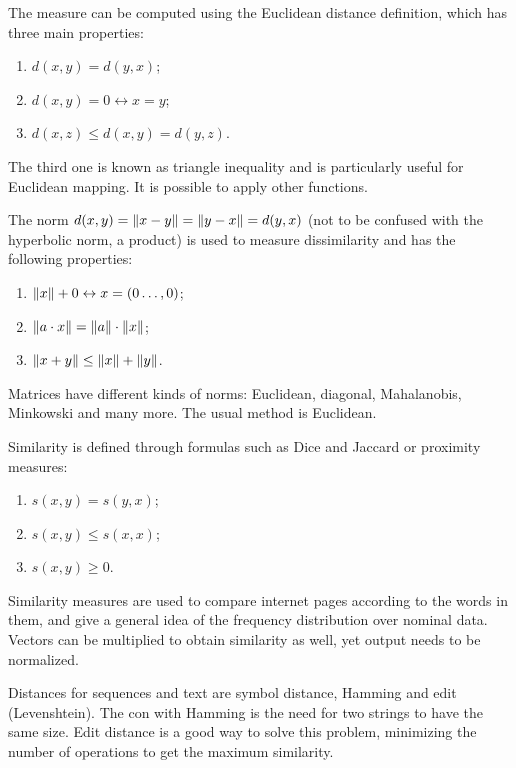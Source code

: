 The measure can be computed using the Euclidean distance definition, which has three main properties:
\begin{enumerate}
	\item $d(x, y) = d(y, x)$;
	\item $d(x, y) = 0 \leftrightarrow x = y$;
	\item $d(x, z) \leq d(x, y) = d(y, z)$.
\end{enumerate}
The third one is known as triangle inequality and is particularly useful for Euclidean mapping. It is possible to apply other functions.

The norm $d(x, y) = \left\lVert x - y\right\rVert = \left\lVert y - x\right\rVert = d(y, x)$ (not to be confused with the hyperbolic norm, a product) is used to measure dissimilarity and has the following properties:
\begin{enumerate}
	\item $\left\lVert x\right\rVert + 0 \leftrightarrow x = (0 \dots, 0)$;
	\item $\left\lVert a \cdot x\right\rVert = \left\lVert a\right\rVert \cdot \left\lVert x\right\rVert$;
	\item $\left\lVert x + y\right\rVert \leq \left\lVert x\right\rVert + \left\lVert y\right\rVert$.
\end{enumerate}

Matrices have different kinds of norms: Euclidean, diagonal, Mahalanobis, Minkowski and many more. The usual method is Euclidean. 

Similarity is defined through formulas such as Dice and Jaccard or proximity measures:
\begin{enumerate}
	\item $s(x, y) = s(y, x)$;
	\item $s(x, y) \leq s(x, x)$;
	\item $s(x, y) \geq 0$.
\end{enumerate}
Similarity measures are used to compare internet pages according to the words in them, and give a general idea of the frequency distribution over nominal data. Vectors can be multiplied to obtain similarity as well, yet output needs to be normalized. 

Distances for sequences and text are symbol distance, Hamming and edit (Levenshtein). The con with Hamming is the need for two strings to have the same size. Edit distance is a good way to solve this problem, minimizing the number of operations to get the maximum similarity. 


